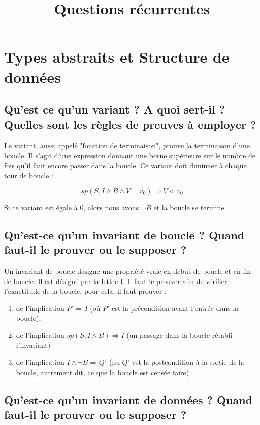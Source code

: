 \documentclass[11pt]{article}
\title{Questions récurrentes}
\begin{document}
\maketitle

\section{Types abstraits et Structure de données}
\subsection{Qu'est ce qu'un variant ? A quoi sert-il ? Quelles sont les règles de preuves à employer ?}

Le variant, aussi appelé "fonction de terminaison", prouve la terminaison d’une boucle. Il s’agit d’une expression donnant une borne supérieure sur le nombre de fois qu’il faut encore passer dans la boucle. 
Ce variant doit diminuer à chaque tour de boucle :

\begin{equation}
	sp(S, I \land B \land V = v_0) \Rightarrow V < v_0 
\end{equation}

Si ce variant est égale à 0, alors nous avons $\lnot B$ et la boucle se termine.

\subsection{Qu'est-ce qu'un invariant de boucle ? Quand faut-il le prouver ou le supposer ?}

Un invariant de boucle désigne une propriété vraie en début de boucle et en fin de boucle. Il est désigné par la lettre I. Il faut le prouver afin de vérifier l’exactitude de la boucle, pour cela, il faut prouver :

\begin{enumerate}
	\item de l’implication $P' \Rightarrow I$ (où $P'$ est la précondition avant l’entrée dans la boucle),
	\item de l'implication $sp(S, I \land B) \Rightarrow I$ (un passage dans la boucle rétabli l'invariant)
	\item de l'implication $I \land \lnot B \Rightarrow Q'$ (pu $Q'$ est la postcondition à la sortie de la boucle, autrement dit, ce que la boucle est censée faire)
\end{enumerate}

\subsection{Qu'est-ce qu'un invariant de données ? Quand faut-il le prouver ou le supposer ?}
\end{document}
